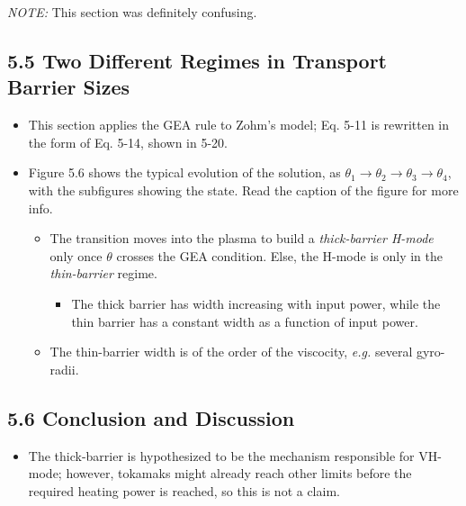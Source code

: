 \documentclass[a4paper]{article}
\begin{document}
\emph{NOTE:} This section was definitely confusing.

\subsection{5.5 Two Different Regimes in Transport Barrier
Sizes}\label{two-different-regimes-in-transport-barrier-sizes}

\begin{itemize}
\item
  This section applies the GEA rule to Zohm's model; Eq. 5-11 is
  rewritten in the form of Eq. 5-14, shown in 5-20.
\item
  Figure 5.6 shows the typical evolution of the solution, as
  $\theta_1 \rightarrow \theta_2 \rightarrow \theta_3 \rightarrow \theta_4$,
  with the subfigures showing the state. Read the caption of the figure
  for more info.

  \begin{itemize}
  \item
    The transition moves into the plasma to build a \emph{thick-barrier
    H-mode} only once $\theta$ crosses the GEA condition. Else, the
    H-mode is only in the \emph{thin-barrier} regime.

    \begin{itemize}
    \itemsep1pt\parskip0pt
    \item
      The thick barrier has width increasing with input power, while the
      thin barrier has a constant width as a function of input power.
    \end{itemize}
  \item
    The thin-barrier width is of the order of the viscocity, \emph{e.g.}
    several gyro-radii.
  \end{itemize}
\end{itemize}

\subsection{5.6 Conclusion and
Discussion}\label{conclusion-and-discussion-1}

\begin{itemize}
\itemsep1pt\parskip0pt
\item
  The thick-barrier is hypothesized to be the mechanism responsible for
  VH-mode; however, tokamaks might already reach other limits before the
  required heating power is reached, so this is not a claim.
\end{itemize}
\end{document}
